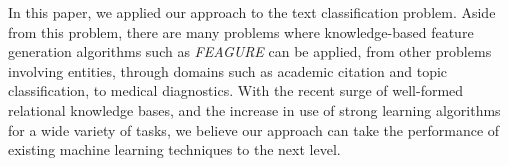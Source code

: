 \documentclass[twoside,11pt]{article}
\theoremstyle{definition}
\begin{document}
In this paper, we applied our approach to the text classification problem. Aside from this problem, there are many problems where knowledge-based feature generation algorithms such as \emph{FEAGURE} can be applied, from other problems involving entities, through domains such as academic citation and topic classification, to medical diagnostics.
With the recent surge of well-formed relational knowledge bases,
and the increase in use of strong learning algorithms for a wide variety of tasks,
we believe our approach can take the performance of existing machine learning techniques to the next level.

\clearpage
\vskip 0.2in


\end{document}
